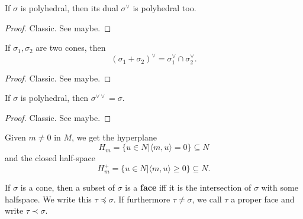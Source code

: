 \begin{proposition}
  \label{1-2-4-dual-polyhedral-cone}

  If $\sigma$ is polyhedral, then its dual $\sigma^\vee$ is polyhedral too.
\end{proposition}
\begin{proof}
  \uses{}

  Classic. See \cite{Oda_1988} maybe.
\end{proof}


\begin{proposition}
  \label{1-2-dual-cone-add}

  If $\sigma_1, \sigma_2$ are two cones, then
  $$(\sigma_1 + \sigma_2)^\vee = \sigma_1^\vee \cap \sigma_2^\vee.$$
\end{proposition}
\begin{proof}
  \uses{}

  Classic. See \cite{Oda_1988} maybe.
\end{proof}


\begin{proposition}
  \label{1-2-4-double-dual-polyhedral-cone}

  If $\sigma$ is polyhedral, then $\sigma^{\vee\vee} = \sigma$.
\end{proposition}
\begin{proof}
  \uses{}

  Classic. See \cite{Oda_1988} maybe.
\end{proof}


Given $m \ne 0$ in $M$, we get the hyperplane
$$H_m = \{u \in N | \langle m, u\rangle = 0\} \subseteq N$$
and the closed half-space
$$H_m^+ = \{u \in N | \langle m, u\rangle \ge 0\} \subseteq N.$$


\begin{definition}
  \label{1-2-5-face}
  \uses{}
  \leanok

  If $\sigma$ is a cone, then a subset of $\sigma$ is a {\bf face} iff it is the intersection of $\sigma$ with some halfspace. We write this $\tau \preceq \sigma$. If furthermore $\tau \ne \sigma$, we call $\tau$ a proper face and write $\tau \prec \sigma$.
\end{definition}


